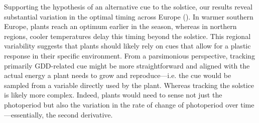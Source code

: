 \documentclass[11pt,letter]{article}
\begin{document}
Supporting the hypothesis of an alternative cue to the solstice, our results reveal substantial variation in the optimal timing across Europe (). In warmer southern Europe, plants reach an optimum earlier in the season, whereas in northern regions, cooler temperatures delay this timing beyond the solstice. 
This regional variability suggests that plants should likely 
rely on cues that allow for a plastic response in their specific environment. 
From a parsimonious perspective, tracking primarily GDD-related cue might be more straightforward and aligned with the actual energy a plant needs to grow and reproduce---i.e. the cue would be sampled from a variable directly used by the plant.
Whereas tracking the solstice is likely more complex. Indeed, plants would need to sense not just the photoperiod but also the variation in the rate of change of photoperiod over time---essentially, the second derivative.
\end{document}

